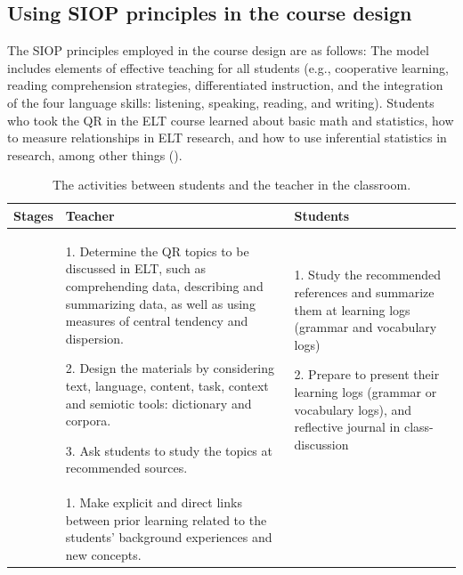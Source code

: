 \documentclass[english]{textolivre}
\begin{document}
\subsection{Using SIOP principles in the course design}
The SIOP principles employed in the course design are as follows: The model includes elements of effective teaching for all students (e.g., cooperative learning, reading comprehension strategies, differentiated instruction, and the integration of the four language skills: listening, speaking, reading, and writing). Students who took the QR in the ELT course learned about basic math and statistics, how to measure relationships in ELT research, and how to use inferential statistics in research, among other things ().

\begin{small}
\renewcommand{\arraystretch}{1.5}
\begin{longtable}{
    >{\raggedright\arraybackslash}p{}
    p{}
    p{}
    }
\caption{The activities between students and the teacher in the classroom.}
\label{tab01}
\\
\toprule
\textbf{Stages} & \textbf{Teacher} & \textbf{Students} \\
\midrule
\parbox[t]{2.5mm}{}
&     

1. Determine the QR topics to be discussed in ELT, such as comprehending data, describing and summarizing data, as well as using measures of central tendency and dispersion.

2. Design the materials by considering text, language, content, task, context and semiotic tools: dictionary and corpora.
    
3. Ask students to study the topics at recommended sources. 
&     
1. Study the recommended references and summarize them at learning logs (grammar and vocabulary logs)

2.  Prepare to present their learning logs (grammar or vocabulary logs), and reflective journal in class-discussion  \\
\midrule
\parbox[t]{2.5mm}{}
&     

1. Make explicit and direct links between prior learning related to the students’ background experiences and new concepts.


\end{longtable}
\end{small}
\end{document}
